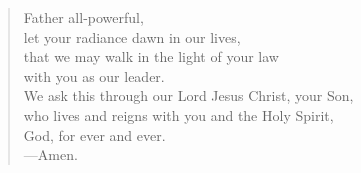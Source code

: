 \prayer

\setlength{\leftmargini}{\prayerleftmargini}

\begin{verse}
Father all-powerful,\\
let your radiance dawn in our lives,\\
that we may walk in the light of your law\\
with you as our leader.\\
We ask this through our Lord Jesus Christ, your Son,\\
who lives and reigns with you and the Holy Spirit,\\
God, for ever and ever.\\
{\color{red}---\thinspace}Amen.
\end{verse}

\setlength{\leftmargini}{\defleftmargini}